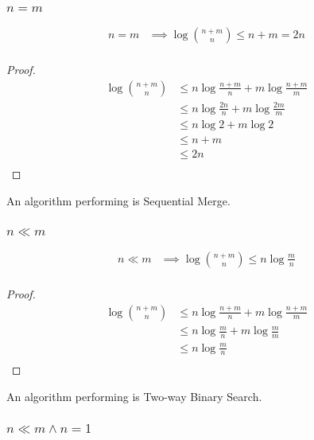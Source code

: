 \subsubsection{$n = m$}

\begin{lemma}
\begin{align*}
n = m &\implies \log\binom{n+m}{n} \leq n + m = 2n\\
\end{align*}
\end{lemma}

\begin{proof}
\begin{align*}
\log\binom{n+m}{n} &\leq n \log\frac{n+m}{n} + m \log\frac{n+m}{m}\\
&\leq n \log\frac{2n}{n} + m \log\frac{2m}{m}\\
&\leq n \log 2 + m \log 2\\
&\leq n + m\\
&\leq 2n\\
\end{align*}
\end{proof}

An algorithm performing  is Sequential Merge.

\subsubsection{$n \ll m$}

\begin{lemma}
\begin{align*}
n \ll m &\implies \log\binom{n+m}{n} \leq n \log\frac{m}{n}\\
\end{align*}
\end{lemma}

\begin{proof}
\begin{align*}
\log\binom{n+m}{n} &\leq n \log\frac{n+m}{n} + m \log\frac{n+m}{m}\\
&\leq n \log\frac{m}{n} + m \log\frac{m}{m}\\
&\leq n \log\frac{m}{n}\\
\end{align*}
\end{proof}

An algorithm performing  is Two-way Binary Search.


\subsubsection{$n \ll m \land n = 1$}

